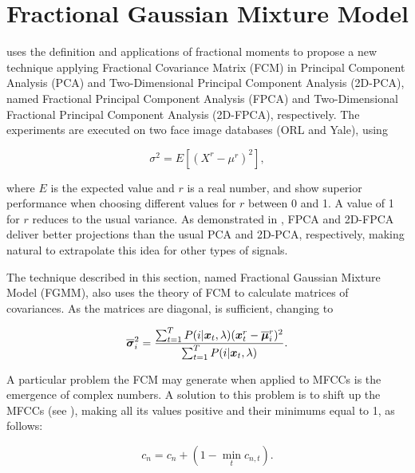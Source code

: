 \section{Fractional Gaussian Mixture Model}
\label{sec:frac-gmm}

 uses the definition and applications of fractional moments to propose a new technique applying Fractional Covariance Matrix (FCM) in Principal Component Analysis (PCA) and Two-Dimensional Principal Component Analysis (2D-PCA), named Fractional Principal Component Analysis (FPCA) and Two-Dimensional Fractional Principal Component Analysis (2D-FPCA), respectively. The experiments are executed on two face image databases (ORL and Yale), using

\begin{equation}
    \sigma^2 = E[(X^r - \mu^r)^2],
    \label{eq:frac-variance}
\end{equation}

\noindent where $E$ is the expected value and $r$ is a real number, and show superior performance when choosing different values for $r$ between 0 and 1. A value of 1 for $r$ reduces  to the usual variance. As demonstrated in , FPCA and 2D-FPCA deliver better projections than the usual PCA and 2D-PCA, respectively, making natural to extrapolate this idea for other types of signals.

The technique described in this section, named Fractional Gaussian Mixture Model (FGMM), also uses the theory of FCM to calculate matrices of covariances. As the matrices are diagonal,  is sufficient, changing  to

\begin{equation}
    \overline{\dvec{\sigma}}_i^2 = \frac{\sum_{t=1}^T \postprob{i}{\dvec{x}_t, \lambda} (\dvec{x}_t^r - \overline{\dvec{\mu}}_i^r)^2}{\sum_{t=1}^T \postprob{i}{\dvec{x}_t, \lambda}}.
    \label{eq:m-step-frac-variances}
\end{equation}

\noindent A particular problem the FCM may generate when applied to MFCCs is the emergence of complex numbers. A solution to this problem is to shift up the MFCCs (see ), making all its values positive and their minimums equal to 1, as follows:

\begin{equation}
    c_n = c_n + (1 - \min_t c_{n,t}).
    \label{eq:mfccs-shift-up}
\end{equation}

